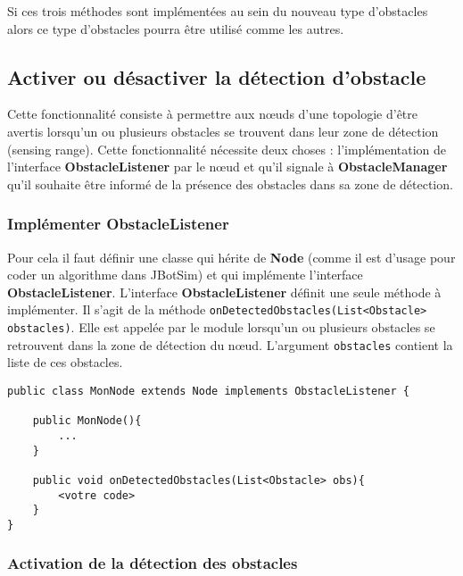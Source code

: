 \documentclass{article}
\begin{document}
Si ces trois méthodes sont implémentées au sein du nouveau type d'obstacles alors ce type d'obstacles pourra être utilisé comme les autres.

\subsection{Activer ou désactiver la détection d'obstacle}

Cette fonctionnalité consiste à permettre aux n\oe uds d'une topologie d'être avertis lorsqu'un ou plusieurs obstacles se trouvent dans leur zone de détection (sensing range).
Cette fonctionnalité nécessite  deux choses : l'implémentation de l'interface \textbf{ObstacleListener} par le n\oe ud et qu'il signale à \textbf{ObstacleManager} qu'il souhaite être informé de la présence des obstacles dans sa zone de détection.

\subsubsection{Implémenter ObstacleListener}


Pour cela il faut définir une classe qui hérite de \textbf{Node} (comme il est d'usage pour coder un algorithme dans JBotSim) et qui implémente l'interface \textbf{ObstacleListener}. L'interface \textbf{ObstacleListener} définit une seule méthode à implémenter. Il s'agit de la méthode \texttt{onDetectedObstacles(List<Obstacle>\\ obstacles)}. Elle est appelée par le module lorsqu'un ou plusieurs obstacles se retrouvent dans la zone de détection du nœud. L'argument \texttt{obstacles} contient la liste de ces obstacles.\smallskip
\begin{lstlisting}[frame=single]
public class MonNode extends Node implements ObstacleListener {

    public MonNode(){
        ...
    }

    public void onDetectedObstacles(List<Obstacle> obs){
        <votre code>
    }
}
\end{lstlisting}
\subsubsection{Activation de la détection des obstacles}
\end{document}
